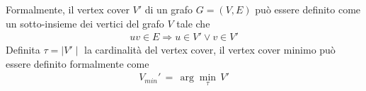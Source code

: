 Formalmente, il vertex cover $V'$ di un grafo $G=(V,E)$ può essere definito come un sotto-insieme dei vertici del grafo $V$ tale che
\begin{align*}
uv \in E \Rightarrow u \in V' \vee v \in V'
\end{align*}
Definita $\tau=\mid V' \mid$ la cardinalità del vertex cover, il vertex cover minimo può essere definito formalmente come
\vspace{-0.5cm}
\begin{align*}
V_{min}' \, = \, \arg\min_{\tau} \, V' 
\end{align*} 

